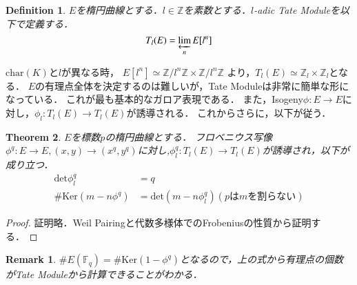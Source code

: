 \documentclass{ujarticle}
\newtheorem{thm}{Theorem}[section]
\newtheorem{dfn}[thm]{Definition}
\newtheorem*{rem}{Remark}
\begin{document}
\begin{dfn}
 $E$を楕円曲線とする．$l \in \mathbb{Z}$を素数とする．$l$-adic Tate Moduleを以下で定義する．
 \begin{equation*}
  T_l(E)= \varprojlim_{n}E[l^n]
 \end{equation*}
\end{dfn}
$\mathrm{char}(K)$と$l$が異なる時，
$E[l^n] \simeq \mathbb{Z}/l^n \mathbb{Z} \times \mathbb{Z}/l^n \mathbb{Z} $
より，$T_l(E)\simeq \mathbb{Z}_l \times \mathbb{Z}_l$となる．
$E$の有理点全体を決定するのは難しいが，Tate Moduleは非常に簡単な形になっている．
これが最も基本的なガロア表現である．
また，Isogeny$\phi:E \to E$に対し，$\phi_l:T_l(E) \to T_l(E)$が誘導される．
これからさらに，以下が従う．
\begin{thm}
  $E$を標数$p$の楕円曲線とする．
  フロベニウス写像$\phi^q: E \to E,(x,y) \to (x^q,y^q)$に対し,$\phi^q_l: T_l(E) \to T_l(E)$が誘導され，以下が成り立つ．
  \begin{align*}
   \mathrm{det}\phi^q_l  &= q \\
   \#\mathrm{Ker}(m - n\phi^q) &= \mathrm{det}(m - n\phi^q_l) (p\mbox{は}m\mbox{を割らない})
 \end{align*}
\end{thm}
\begin{proof}
 証明略．Weil Pairingと代数多様体でのFrobeniusの性質から証明する．
\end{proof}
\begin{rem}
 $\#E(\mathbb{F}_q)=\#\mathrm{Ker}(1 - \phi^q)$となるので，上の式から有理点の個数がTate Moduleから計算できることがわかる．
\end{rem}
\end{document}
